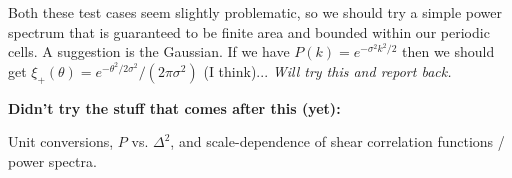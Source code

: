 \documentclass[preprint]{aastex}
\begin{document}
Both these test cases seem slightly problematic, so we should try a simple
power spectrum that is guaranteed to be finite area and bounded within
our periodic cells.  A suggestion is the Gaussian.  If we have $P(k) =
e^{-\sigma^2 k^2 / 2}$ then we should get $\xi_+(\theta) =
e^{-\theta^2/2\sigma^2}/(2 \pi \sigma^2)$ (I think)...
{\em Will try this and report back.}

\textbf{Didn't try the stuff that comes after this (yet):}

Unit conversions, $P$ vs. $\Delta^2$, and scale-dependence of shear
correlation functions / power spectra.
\end{document}
